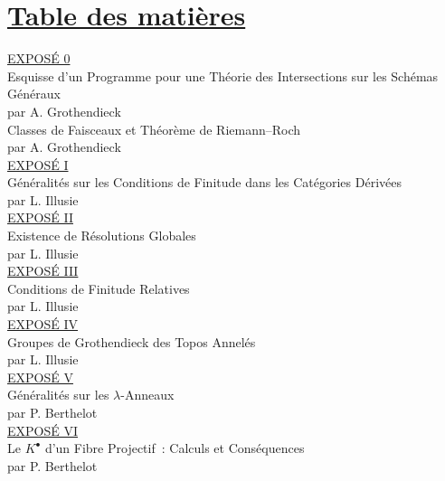 \section*{\underline{Table des matières}}

\noindent
\underline{EXPOSÉ 0}\\
Esquisse d'un Programme pour une Théorie des Intersections sur les Schémas Généraux\\
par A. Grothendieck \\[8pt]
Classes de Faisceaux et Théorème de Riemann--Roch\\
par A. Grothendieck \\[8pt]
\underline{EXPOSÉ I}\\
Généralités sur les Conditions de Finitude dans les Catégories Dérivées\\
par L. Illusie \\[8pt]
\underline{EXPOSÉ II}\\
Existence de Résolutions Globales\\
par L. Illusie \\[8pt]
\underline{EXPOSÉ III}\\
Conditions de Finitude Relatives\\
par L. Illusie \\[8pt]
\underline{EXPOSÉ IV}\\
Groupes de Grothendieck des Topos Annelés\\
par L. Illusie \\[8pt]
\underline{EXPOSÉ V}\\
Généralités sur les $\lambda$-Anneaux\\
par P. Berthelot \\[8pt]
\underline{EXPOSÉ VI}\\
Le $K^{\bullet}$ d'un Fibre Projectif~: Calculs et Conséquences\\
par P. Berthelot \\[8pt]

